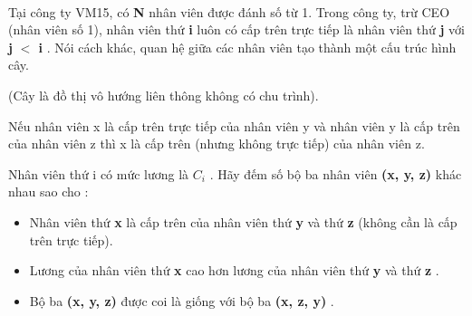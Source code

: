  

Tại công ty VM15, có \textbf{ N } nhân viên được đánh số từ 1. Trong công ty, trừ CEO (nhân viên số 1), nhân viên thứ \textbf{ i } luôn có cấp trên trực tiếp là nhân viên thứ \textbf{ j } với \textbf{ j }\textbf{ $<$ i } . Nói cách khác, quan hệ giữa các nhân viên tạo thành một cấu trúc hình cây.

(Cây là đồ thị vô hướng liên thông không có chu trình).

Nếu nhân viên x là cấp trên trực tiếp của nhân viên y và nhân viên y là cấp trên của nhân viên z thì x là cấp trên (nhưng không trực tiếp) của nhân viên z.

Nhân viên thứ i có mức lương là \textbf{ $C_{i}$} . Hãy đếm số bộ ba nhân viên \textbf{ (x, y, z) } khác nhau sao cho :
\begin{itemize}
	\item Nhân viên thứ \textbf{ x } là cấp trên của nhân viên thứ \textbf{ y } và thứ \textbf{ z } (không cần là cấp trên trực tiếp).
	\item Lương của nhân viên thứ \textbf{ x } cao hơn lương của nhân viên thứ \textbf{ y } và thứ \textbf{ z } .
	\item Bộ ba \textbf{ (x, y, z) } được coi là giống với bộ ba \textbf{ (x, z, y) } .
\end{itemize}